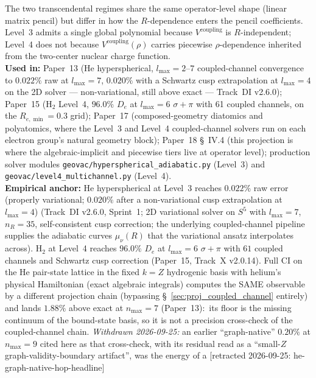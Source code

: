 \documentclass[11pt]{article}
\begin{document}
The two transcendental regimes share the same operator-level shape
(linear matrix pencil) but differ in how the $R$-dependence enters
the pencil coefficients.  Level~3 admits a single global polynomial
because $V^\text{coupling}$ is $R$-independent; Level~4 does not
because $V^\text{coupling}(\rho)$ carries piecewise $\rho$-dependence
inherited from the two-center nuclear charge function.\\
\textbf{Used in:} Paper~13 (He hyperspherical, $l_\text{max}=2$--$7$
coupled-channel convergence to $0.022\%$ raw at $l_\text{max}=7$,
$0.020\%$ with a Schwartz cusp extrapolation at $l_\text{max}=4$ on the 2D
solver --- non-variational, still above exact --- Track~DI v2.6.0); Paper~15 (H$_2$ Level~4,
$96.0\%$ $D_e$ at $l_\text{max}=6$ $\sigma+\pi$ with 61 coupled
channels, on the $R_{e,\min} = 0.3$ grid); Paper~17 (composed-geometry diatomics and polyatomics,
where the Level~3 and Level~4 coupled-channel solvers run on each
electron group's natural geometry block); Paper~18 \S~IV.4 (this
projection is where the algebraic-implicit and piecewise tiers live
at operator level); production solver modules
\texttt{geovac/hyperspherical\_adiabatic.py} (Level~3) and
\texttt{geovac/level4\_multichannel.py} (Level~4).\\
\textbf{Empirical anchor:} He hyperspherical at Level~3 reaches
$0.022\%$ raw error (properly variational; $0.020\%$ after a
non-variational cusp extrapolation at $l_\text{max}=4$) (Track~DI
v2.6.0, Sprint~1; 2D variational solver on
$S^5$ with $l_\text{max}=7$, $n_R=35$, self-consistent cusp
correction; the underlying coupled-channel pipeline supplies the
adiabatic curves $\mu_\nu(R)$ that the variational ansatz interpolates
across).  H$_2$ at Level~4 reaches $96.0\%$ $D_e$ at $l_\text{max}=6$
$\sigma+\pi$ with $61$ coupled channels and Schwartz cusp correction
(Paper~15, Track~X v2.0.14).  Full CI on the He pair-state lattice
in the fixed $k=Z$ hydrogenic basis with helium's physical Hamiltonian
(exact algebraic integrals) computes the SAME observable by a
different projection chain (bypassing
\S~\ref{sec:proj_coupled_channel} entirely) and lands
$1.88\%$ above exact at $n_\text{max}=7$ (Paper~13):\ its floor is the
missing continuum of the bound-state basis, so it is not a precision
cross-check of the coupled-channel chain.  \emph{Withdrawn
2026-09-25:} an earlier ``graph-native'' $0.20\%$ at $n_\text{max}=9$
cited here as that cross-check, with its residual read as a
``small-$Z$ graph-validity-boundary artifact'', was the energy of a [retracted 2026-09-25: he-graph-native-hop-headline]
\end{document}
